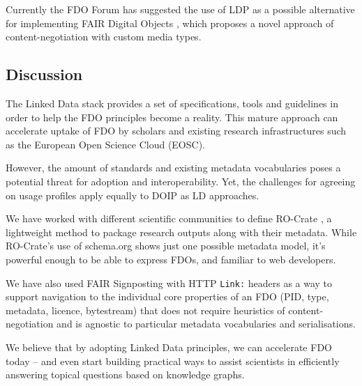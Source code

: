 Currently the FDO Forum has suggested the use of LDP as a possible
alternative for implementing FAIR Digital Objects \cite{bonino2021}, which
proposes a novel approach of content-negotiation with custom media
types.

\subsection{Discussion}\label{ch2:discussion}

The Linked Data stack provides a set of specifications, tools and
guidelines in order to help the FDO principles become a reality. This
mature approach can accelerate uptake of FDO by scholars and existing
research infrastructures such as the European Open Science Cloud (EOSC).

However, the amount of standards and existing metadata vocabularies
poses a potential threat for adoption and interoperability. Yet, the
challenges for agreeing on usage profiles apply equally to DOIP as LD
approaches.

We have worked with different scientific communities to define 
RO-Crate \cite{Soiland-Reyes 2022}, a
lightweight method to package research outputs along with their
metadata. While RO-Crate's use of schema.org shows just one possible
metadata model, it's powerful enough to be able to express FDOs, and
familiar to web developers.

We have also used FAIR Signposting \cite{Van de Sompel 2022} with HTTP
\texttt{Link:} headers as a way to support navigation to the individual
core properties of an FDO (PID, type, metadata, licence, bytestream)
that does not require heuristics of content-negotiation and is agnostic
to particular metadata vocabularies and serialisations.

We believe that by adopting Linked Data principles, we can accelerate
FDO today -- and even start building practical ways to assist scientists
in efficiently answering topical questions based on knowledge graphs.

